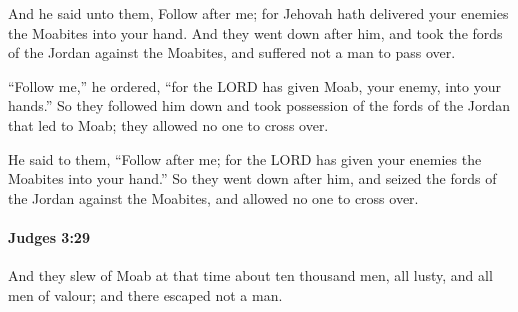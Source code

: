 			\begin{versebox}
					\item[BHS] 
					\item[ASV] And he said unto them, Follow after me; for Jehovah hath delivered your enemies the Moabites into your hand. And they went down after him, and took the fords of the Jordan against the Moabites, and suffered not a man to pass over.
					\item[NIV] “Follow me,” he ordered, “for the LORD has given Moab, your enemy, into your hands.” So they followed him down and took possession of the fords of the Jordan that led to Moab; they allowed no one to cross over.
					\item[NRSV] He said to them, “Follow after me; for the LORD has given your enemies the Moabites into your hand.” So they went down after him, and seized the fords of the Jordan against the Moabites, and allowed no one to cross over.
			\end{versebox}

		\paragraph{Judges 3:29} %
			\label{JUDGES-3-29}

			And they slew of Moab at that time about ten thousand men, all lusty, and all men of valour; and there escaped not a man.

